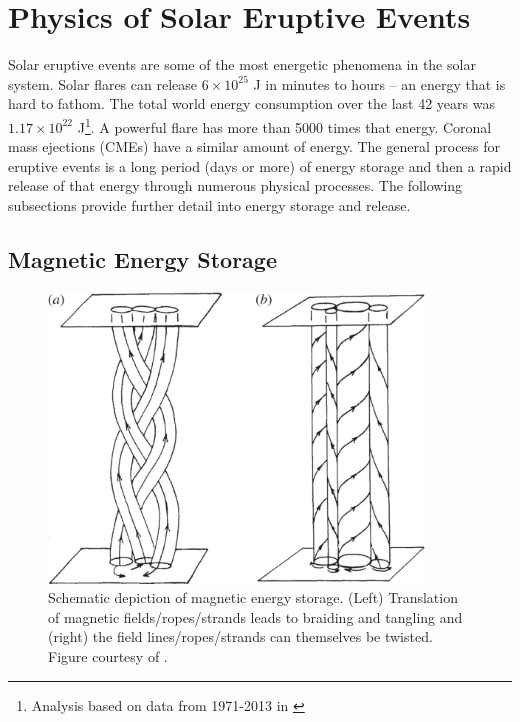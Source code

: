 \section{Physics of Solar Eruptive Events}
\label{sec:physicssolareruptiveevents}
Solar eruptive events are some of the most energetic phenomena in the solar system. Solar flares can release $6 \times 10^{25}$ J in minutes to hours -- an energy that is hard to fathom. The total world energy consumption over the last 42 years was $1.17 \times 10^{22}$ J\footnote{Analysis based on data from 1971-2013 in \citet{iea2015}}. A powerful flare has more than 5000 times that energy. Coronal mass ejections (CMEs) have a similar amount of energy. The general process for eruptive events is a long period (days or more) of energy storage and then a rapid release of that energy through numerous physical processes. The following subsections provide further detail into energy storage and release.

\subsection{Magnetic Energy Storage}

\begin{figure}[!h]
    \begin{center}
	    \includegraphics[width=100mm]{Images/MagneticEnergyStorage.png}
    \end{center}
    \caption[Magnetic Energy Storage Diagram]{
        Schematic depiction of magnetic energy storage. (Left) Translation of magnetic fields/ropes/strands leads to 
        braiding and tangling and (right) the field lines/ropes/strands can themselves be twisted. Figure courtesy of 
        \citet{Klimchuk2015}. 
    }
    \label{fig:magneticenergystorage}
\end{figure}

